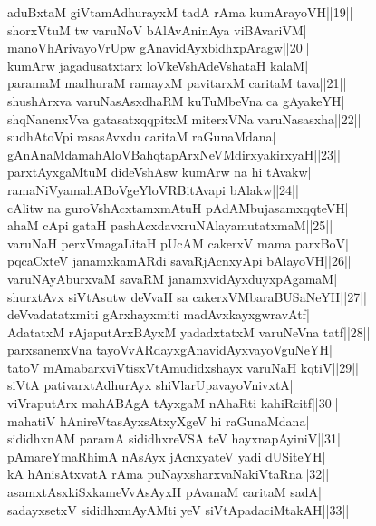 \documentclass{article}
\begin{document}
aduBxtaM giVtamAdhurayxM tadA rAma kumArayoVH||19||\\
shorxVtuM tw varuNoV bAlAvAninAya viBAvariVM|\\
manoVhArivayoVrUpw gAnavidAyxbidhxpAragw||20||\\
kumArw jagadusatxtarx loVkeVshAdeVshataH kalaM|\\
paramaM madhuraM ramayxM pavitarxM caritaM tava||21||\\
shushArxva varuNasAsxdhaRM kuTuMbeVna ca gAyakeYH|\\
shqNanenxVva gatasatxqqpitxM miterxVNa varuNasasxha||22||\\
sudhAtoVpi rasasAvxdu caritaM raGunaMdana|\\
gAnAnaMdamahAloVBahqtapArxNeVMdirxyakirxyaH||23||\\
parxtAyxgaMtuM dideVshAsw kumArw na hi tAvakw|\\
ramaNiVyamahABoVgeYloVRBitAvapi bAlakw||24||\\
cAlitw na guroVshAcxtamxmAtuH pAdAMbujasamxqqteVH|\\
ahaM cApi gataH pashAcxdavxruNAlayamutatxmaM||25||\\
varuNaH perxVmagaLitaH pUcAM cakerxV mama parxBoV|\\
pqcaCxteV janamxkamARdi savaRjAcnxyApi bAlayoVH||26||\\
varuNAyAburxvaM savaRM janamxvidAyxduyxpAgamaM|\\
shurxtAvx siVtAsutw deVvaH sa cakerxVMbaraBUSaNeYH||27||\\
deVvadatatxmiti gArxhayxmiti madAvxkayxgwravAtf|\\
AdatatxM rAjaputArxBAyxM yadadxtatxM varuNeVna tatf||28||\\
parxsanenxVna tayoVvARdayxgAnavidAyxvayoVguNeYH|\\
tatoV mAmabarxviVtisxVtAmudidxshayx varuNaH kqtiV||29||\\
siVtA pativarxtAdhurAyx shiVlarUpavayoVnivxtA|\\
viVraputArx mahABAgA tAyxgaM nAhaRti kahiRcitf||30||\\
mahatiV hAnireVtasAyxsAtxyXgeV hi raGunaMdana|\\
sididhxnAM paramA sididhxreVSA teV hayxnapAyiniV||31||\\
pAmareYmaRhimA nAsAyx jAcnxyateV yadi dUSiteYH|\\
kA hAnisAtxvatA rAma puNayxsharxvaNakiVtaRna||32||\\
asamxtAsxkiSxkameVvAsAyxH pAvanaM caritaM sadA|\\
sadayxsetxV sididhxmAyAMti yeV siVtApadaciMtakAH||33||\\
\end{document}
